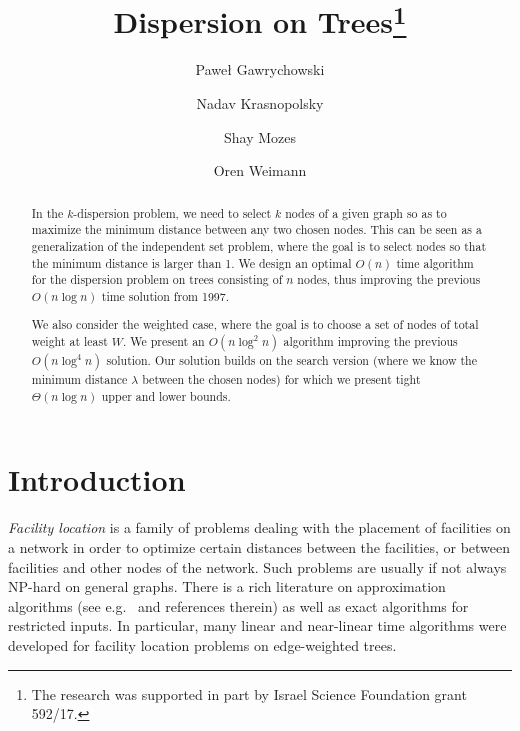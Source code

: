 \documentclass[11pt,a4paper]{article}
\newcommand{\Oh}{{O}}
\theoremstyle{definition}
\theoremstyle{remark}
\begin{document}
\title{Dispersion on Trees\thanks{The research was supported in part by Israel Science Foundation grant 592/17.}}
\author[1]{Pawe\l{} Gawrychowski}
\author[1]{Nadav Krasnopolsky}
\author[2]{Shay Mozes}
\author[1]{Oren Weimann}


\date{}
\maketitle

\begin{abstract}
In the $k$-dispersion problem, we need to select $k$ nodes of a given graph so as to maximize
the minimum distance between any two chosen nodes. This can be seen as a generalization
of the independent set problem, where the goal is to select nodes so that the minimum distance
is larger than 1.
We design an optimal $\Oh(n)$ time algorithm for the dispersion problem on trees consisting
of $n$ nodes, thus improving the previous  $\Oh(n\log n)$ time solution from 1997. 

We also consider the weighted case, where the goal is to choose a set of nodes of total weight at least $W$. We present an $\Oh(n\log^2n)$ algorithm improving the previous $\Oh(n\log^4 n)$ solution. Our solution builds on the search version (where we know the minimum distance $\lambda$ between the chosen nodes) for which we present tight $\Theta(n\log n)$ upper and lower bounds. 
\end{abstract}

\section{Introduction}

\emph{Facility location} is a family of problems dealing with the placement of facilities on a network in order to optimize certain distances between the facilities, or between facilities and other nodes of the network. Such problems are usually if not always NP-hard on general graphs. There is a rich literature on approximation algorithms (see e.g.~\cite{DavidB.Shmoys1997,Vazirani2003} and references therein) as well as exact algorithms for restricted inputs. In particular, many linear and near-linear time algorithms were developed for facility location problems on edge-weighted trees.   
\end{document}

